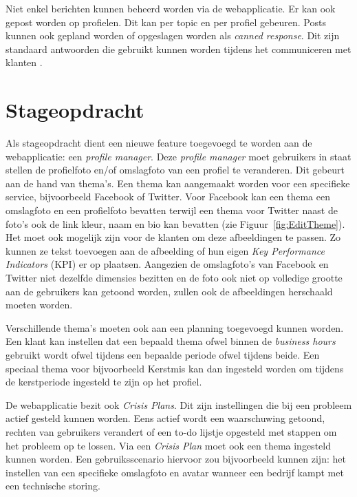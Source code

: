 Niet enkel berichten kunnen beheerd worden via de webapplicatie. Er kan ook gepost worden op profielen. Dit kan per topic en per profiel gebeuren. Posts kunnen ook gepland worden of opgeslagen worden als \textit{canned response}. Dit zijn standaard antwoorden die gebruikt kunnen worden tijdens het communiceren met klanten \cite{EngagorApp}.
 
\chapter{Stageopdracht}
\vspace{-3cm}
Als stageopdracht dient een nieuwe feature toegevoegd te worden aan de webapplicatie: een \textit{profile manager}. Deze \textit{profile manager} moet gebruikers in staat stellen de profielfoto en/of omslagfoto van een profiel te veranderen. Dit gebeurt aan de hand van thema's. Een thema kan aangemaakt worden voor een specifieke service, bijvoorbeeld Facebook of Twitter. Voor Facebook kan een thema een omslagfoto en een profielfoto bevatten terwijl een thema voor Twitter naast de foto's ook de link kleur, naam en bio kan bevatten (zie Figuur~\ref{fig:EditTheme}). Het moet ook mogelijk zijn voor de klanten om deze afbeeldingen te passen. Zo kunnen ze tekst toevoegen aan de afbeelding of hun eigen \textit{Key Performance Indicators} (KPI) er op plaatsen. Aangezien de omslagfoto's van Facebook en Twitter niet dezelfde dimensies bezitten en de foto ook niet op volledige grootte aan de gebruikers kan getoond worden, zullen ook de afbeeldingen herschaald moeten worden.

Verschillende thema's moeten ook aan een planning toegevoegd kunnen worden. Een klant kan instellen dat een bepaald thema ofwel binnen de \textit{business hours} gebruikt wordt ofwel tijdens een bepaalde periode ofwel tijdens beide. Een speciaal thema voor bijvoorbeeld Kerstmis kan dan ingesteld worden om tijdens de kerstperiode ingesteld te zijn op het profiel. 

De webapplicatie bezit ook \textit{Crisis Plans}. Dit zijn instellingen die bij een probleem actief gesteld kunnen worden. Eens actief wordt een waarschuwing getoond, rechten van gebruikers verandert of een to-do lijstje opgesteld met stappen om het probleem op te lossen. Via een \textit{Crisis Plan} moet ook een thema ingesteld kunnen worden. Een gebruiksscenario hiervoor zou bijvoorbeeld kunnen zijn: het instellen van een specifieke omslagfoto en avatar wanneer een bedrijf kampt met een technische storing. 

